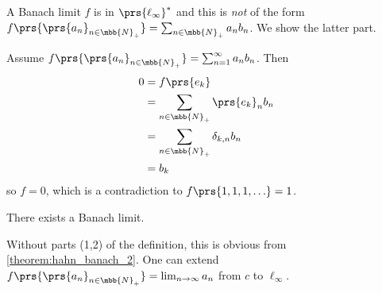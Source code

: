 \documentclass[10pt, twoside]{book}
\begin{document}
\begin{remark}
A Banach limit $f$ is in $\prs{\ell_\infty}^*$ and this is \emph{not} of the form $f\prs{\prs{a_n}_{n \in \mbb{N}_+}} = \sum_{n \in \mbb{N}_+} a_n b_n$. We show the latter part.

Assume $f\prs{\prs{a_n}_{n \in \mbb{N}_+}} = \sum_{n=1}^{\infty} a_n b_n$. Then
\begin{align*}
0 &= f\prs{e_k} \\&= \sum_{n \in \mbb{N}_+} \prs{e_k}_n b_n \\&= \sum_{n \in \mbb{N}_+} \delta_{k,n} b_n \\&= b_k
\end{align*}
so $f = 0$, which is a contradiction to $f\prs{1,1,1,\ldots} = 1$.
\end{remark}

\begin{theorem}
There exists a Banach limit.
\end{theorem}

\begin{remark}
Without parts (1,2) of the definition, this is obvious from \ref{theorem:hahn_banach_2}. One can extend $f\prs{\prs{a_n}_{n \in \mbb{N}_+}} = \lim_{n \to \infty} a_n$ from $c$ to $\ell_\infty$.
\end{remark}
\end{document}

